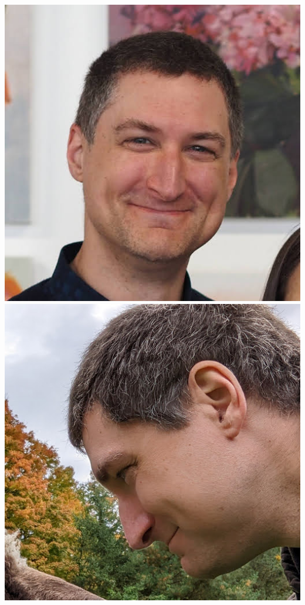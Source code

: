 \documentclass{article}
\begin{document}
\begin{center}
    \includegraphics[scale=0.125]{.imgs/dataset/00000-0-P3095395.jpg}
    \includegraphics[scale=0.125]{.imgs/dataset/00003-0-PXL_20221009_180554011.jpg}

\end{center}
\end{document}
